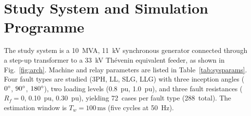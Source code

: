 \documentclass[10pt,journal,twoside]{IEEEtran}
\newcommand{\mss}{\,\text{ms}}
\begin{document}
\section{Study System and Simulation Programme}
\label{sec:system}

The study system is a 10~MVA, 11~kV synchronous generator connected through
a step-up transformer to a 33~kV Th\'{e}venin equivalent feeder, as shown
in Fig.~\ref{fig:arch}.  Machine and relay parameters are listed in
Table~\ref{tab:sysparams}.  Four fault types are studied (3PH, LL, SLG, LLG)
with three inception angles ($0\degree$, $90\degree$, $180\degree$),
two loading levels (0.8~pu, 1.0~pu), and three fault resistances
($R_f = 0$, 0.10~pu, 0.30~pu), yielding 72~cases per fault type
(288~total).  The estimation window is $T_w = 100\mss$ (five cycles at
50~Hz).
\end{document}
